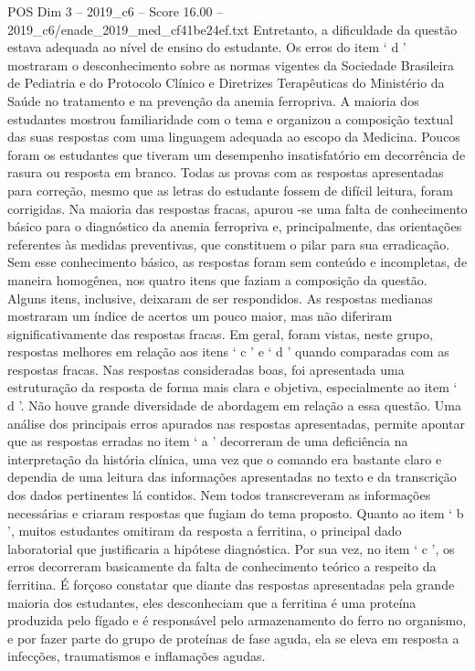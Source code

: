 \begin{textsample}{POS Dim 3 – 2019\_c6 – Score 16.00 – 2019\_c6/enade\_2019\_med\_cf41be24ef.txt}
Entretanto, a dificuldade da questão estava adequada ao nível de ensino do estudante.
Os erros do item ‘ d ’ mostraram o desconhecimento sobre as normas vigentes da Sociedade Brasileira de Pediatria e do Protocolo Clínico e Diretrizes Terapêuticas do Ministério da Saúde no tratamento e na prevenção da anemia ferropriva.
A maioria dos estudantes mostrou familiaridade com o tema e organizou a composição textual das suas respostas com uma linguagem adequada ao escopo da Medicina.
Poucos foram os estudantes que tiveram um desempenho insatisfatório em decorrência de rasura ou resposta em branco.
Todas as provas com as respostas apresentadas para correção, mesmo que as letras do estudante fossem de difícil leitura, foram corrigidas.
Na maioria das respostas fracas, apurou -se uma falta de conhecimento básico para o diagnóstico da anemia ferropriva e, principalmente, das orientações referentes às medidas preventivas, que constituem o pilar para sua erradicação.
Sem esse conhecimento básico, as respostas foram sem conteúdo e incompletas, de maneira homogênea, nos quatro itens que faziam a composição da questão.
Alguns itens, inclusive, deixaram de ser respondidos.
As respostas medianas mostraram um índice de acertos um pouco maior, mas não diferiram significativamente das respostas fracas.
Em geral, foram vistas, neste grupo, respostas melhores em relação aos itens ‘ c ’ e ‘ d ’ quando comparadas com as respostas fracas.
Nas respostas consideradas boas, foi apresentada uma estruturação da resposta de forma mais clara e objetiva, especialmente ao item ‘ d ’.
Não houve grande diversidade de abordagem em relação a essa questão.
Uma análise dos principais erros apurados nas respostas apresentadas, permite apontar que as respostas erradas no item ‘ a ’ decorreram de uma deficiência na interpretação da história clínica, uma vez que o comando era bastante claro e dependia de uma leitura das informações apresentadas no texto e da transcrição dos dados pertinentes lá contidos.
Nem todos transcreveram as informações necessárias e criaram respostas que fugiam do tema proposto.
Quanto ao item ‘ b ’, muitos estudantes omitiram da resposta a ferritina, o principal dado laboratorial que justificaria a hipótese diagnóstica.
Por sua vez, no item ‘ c ’, os erros decorreram basicamente da falta de conhecimento teórico a respeito da ferritina.
É forçoso constatar que diante das respostas apresentadas pela grande maioria dos estudantes, eles desconheciam que a ferritina é uma proteína produzida pelo fígado e é responsável pelo armazenamento do ferro no organismo, e por fazer parte do grupo de proteínas de fase aguda, ela se eleva em resposta a infecções, traumatismos e inflamações agudas.

\end{textsample}
